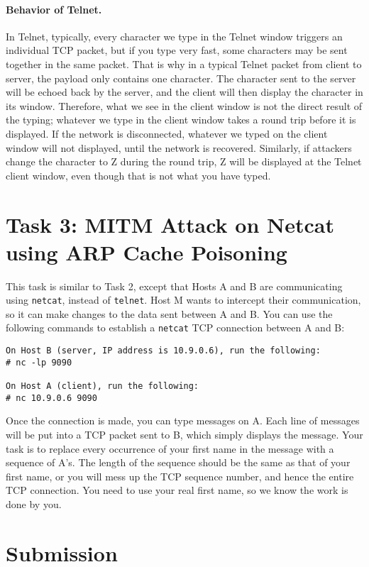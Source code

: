 \paragraph{Behavior of Telnet.}
In Telnet, typically, every character we type in the Telnet window triggers
an individual TCP packet, but if you type very fast, some characters may be 
sent together in the same packet. 
That is why in a typical Telnet packet from client to server, 
the payload only contains one character.  The
character sent to the server will be echoed back by the server, 
and the client will then display the
character in its window. Therefore, what we see in the client window is not the direct result
of the typing; whatever we type in the client window takes a round trip before it is displayed.
If the network is disconnected, whatever we typed on the client window will not displayed,
until the network is recovered. Similarly, if attackers change the character to Z during the
round trip, Z will be displayed at the Telnet client window, even though
that is not what you have typed.




\section{Task 3: MITM Attack on Netcat using ARP Cache Poisoning}

This task is similar to Task 2, except that
Hosts A and B are communicating using \texttt{netcat}, instead of \texttt{telnet}.
Host M wants to intercept their
communication, so it can make changes to the data sent between A and B.
You can use the following commands to establish a \texttt{netcat} TCP
connection between A and B:


\begin{lstlisting}
On Host B (server, IP address is 10.9.0.6), run the following:
# nc -lp 9090

On Host A (client), run the following:
# nc 10.9.0.6 9090
\end{lstlisting}
 

Once the connection is made, you can type messages on A.
Each line of messages will be put into a TCP packet sent 
to B, which simply displays the message.  
Your task is to replace every occurrence of your first name in the 
message with a sequence of A's. The length of the sequence should be the 
same as that of your first name, or you will mess up the TCP sequence
number, and hence the entire TCP connection. You need to use your real
first name, so we know the work is done by you.  



\section{Submission}









